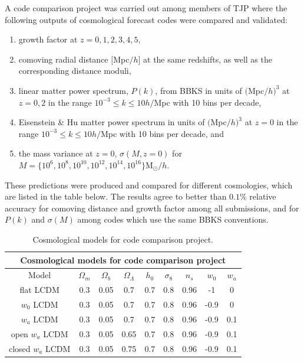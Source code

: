 \documentclass[\docopts]{\docclass}
\begin{document}
A code comparison project was carried out among members of TJP where the following outputs of cosmological forecast codes were compared and validated:
\begin{enumerate}
\item growth factor at $z = 0,1,2,3,4,5$,
\item comoving radial distance $[$Mpc$/h]$ at the same redshifts, as well as the corresponding distance moduli,
\item linear matter power spectrum, $P(k)$, from BBKS \citep{BBKS} in units of $($Mpc$/h)^3$ at $z=0,2$ in the range $10^{-3} \leq k \leq 10 h/$Mpc with 10 bins per decade,
\item Eisenstein \& Hu matter power spectrum in units of $($Mpc$/h)^3$ at $z=0$ in the range $10^{-3} \leq k \leq 10 h/$Mpc with 10 bins per decade, and
\item the mass variance at $z=0$, $\sigma(M,z=0)$ for $M =\{10^6, 10^8, 10^{10}, 10^{12}, 10^{14}, 10^{16}\} $M$_\odot/h$.
\end{enumerate}
These predictions were produced and compared for different cosmologies, which are listed in the table below. The results agree to better than $0.1\%$ relative accuracy for comoving distance and growth factor among all submissions, and for $P(k)$ and $\sigma(M)$ among codes which use the same BBKS conventions.

\begin{table}[t]
  \centering
  \begin{tabular}{ c | c c c c c c c c }
    \hline
    \multicolumn{9}{|c|}{Cosmological models for code comparison project} \\
    \hline
    \hline
    Model & $\Omega_m$ & $\Omega_b$ & $\Omega_\Lambda$ & $h_0$ & $\sigma_8$ & $n_s$ & $w_0$ & $w_a$ \\
    \hline
    flat LCDM & 0.3 & 0.05 & 0.7 & 0.7 & 0.8 & 0.96 & -1 & 0 \\
    $w_0$ LCDM & 0.3 & 0.05 & 0.7 & 0.7 & 0.8 & 0.96 & -0.9 & 0  \\
    $w_a$ LCDM & 0.3 & 0.05 & 0.7 & 0.7 & 0.8 & 0.96 & -0.9 & 0.1  \\
    open $w_a$ LCDM & 0.3 & 0.05 & 0.65 & 0.7 & 0.8 & 0.96 & -0.9 & 0.1  \\
    closed $w_a$ LCDM & 0.3 & 0.05 & 0.75 & 0.7 & 0.8 & 0.96 & -0.9 & 0.1  \\
    \hline
  \end{tabular}
  \caption{Cosmological models for code comparison project.}
  \label{tab:cosmologies}
\end{table}
\end{document}
